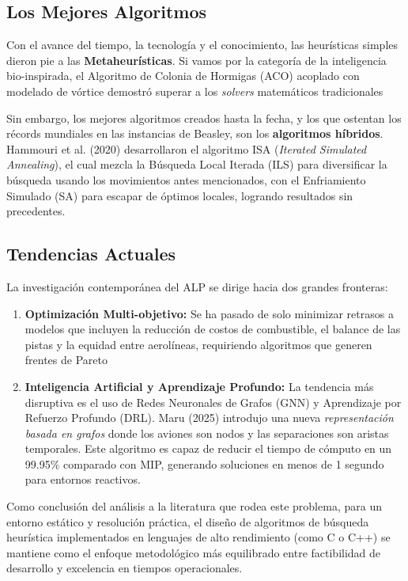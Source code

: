\documentclass[letter, 10pt]{article}
\begin{document}
\subsection{Los Mejores Algoritmos}
Con el avance del tiempo, la tecnolog\'ia y el conocimiento, las heur\'isticas simples dieron pie a las \textbf{Metaheur\'isticas}. Si vamos por la categor\'ia de la inteligencia bio-inspirada, el Algoritmo de Colonia de Hormigas (ACO) acoplado con modelado de v\'ortice demostr\'o superar a los \textit{solvers} matem\'aticos tradicionales \cite{xu2017}

Sin embargo, los mejores algoritmos creados hasta la fecha, y los que ostentan los r\'ecords mundiales en las instancias de Beasley, son los \textbf{algoritmos h\'ibridos}. Hammouri et al. (2020) \cite{hammouri2020} desarrollaron el algoritmo ISA (\textit{Iterated Simulated Annealing}), el cual mezcla la B\'usqueda Local Iterada (ILS) para diversificar la b\'usqueda usando los movimientos antes mencionados, con el Enfriamiento Simulado (SA) para escapar de \'optimos locales, logrando resultados sin precedentes.

\subsection{Tendencias Actuales}
La investigaci\'on contempor\'anea del ALP se dirige hacia dos grandes fronteras:
\begin{enumerate}
    \item \textbf{Optimizaci\'on Multi-objetivo:} Se ha pasado de solo minimizar retrasos a modelos que incluyen la reducci\'on de costos de combustible, el balance de las pistas y la equidad entre aerol\'ineas, requiriendo algoritmos que generen frentes de Pareto \cite{zhang2020}
    \item \textbf{Inteligencia Artificial y Aprendizaje Profundo:} La tendencia m\'as disruptiva es el uso de Redes Neuronales de Grafos (GNN) y Aprendizaje por Refuerzo Profundo (DRL). Maru (2025)\cite{maru2025} introdujo una nueva \textit{representaci\'on basada en grafos} donde los aviones son nodos y las separaciones son aristas temporales. Este algoritmo es capaz de reducir el tiempo de c\'omputo en un 99.95\% comparado con MIP, generando soluciones en menos de 1 segundo para entornos reactivos.
\end{enumerate}

Como conclusi\'on del an\'alisis a la literatura que rodea este problema, para un entorno est\'atico y resoluci\'on pr\'actica, el dise\~no de 
algoritmos de b\'usqueda heur\'istica implementados en lenguajes de alto rendimiento (como C o C++) se mantiene 
como el enfoque metodol\'ogico m\'as equilibrado entre factibilidad de desarrollo y excelencia en 
tiempos operacionales.
\end{document}
